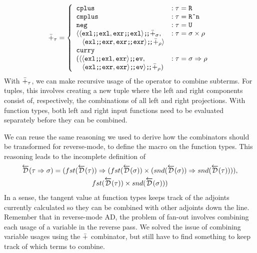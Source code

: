   \begin{align*}
    \synP_\tau =
      \left\{
        \begin{array}{ll}
          \synCplus & : \tau = \synR \\
          \synCmplus & : \tau = \synRn \\
          \synNeg & : \tau = \synUnit \\
          \langle
            \synSeq{\langle \synSeq{\synExl}{\synExl}, \synSeq{\synExr}{\synExl} \rangle}{\synP_\sigma}, & : \tau = \sigma \synStar \rho \\
            \;\;\;\synSeq{\langle \synSeq{\synExl}{\synExr}, \synSeq{\synExr}{\synExr} \rangle}{\synP_\rho} \rangle \\
          \synCurry{ \\
            (\synSeq{\langle
              \synSeq{\langle \synSeq{\synExl}{\synExl}, \synExr \rangle}{\synEv}, & : \tau = \sigma \synFunc \rho \\
              \;\;\;\synSeq{\langle \synSeq{\synExl}{\synExr}, \synExr \rangle}{\synEv} \rangle}{\synP_\rho})} \\
        \end{array}
      \right.
  \end{align*}
  With $\bar{+}_\tau$, we can make recursive usage of the operator to combine subterms.
  For tuples, this involves creating a new tuple where the left and right components consist of, respectively, the combinations of all left and right projections.
  With function types, both left and right input functions need to be evaluated separately before they can be combined.

  We can reuse the same reasoning we used to derive how the combinators should be transformed for reverse-mode, to define the macro on the function types.
  This reasoning leads to the incomplete definition of
  \begin{multline}
    \overleftarrow{\mathcal{D}}(\tau \Rightarrow \sigma) = (fst(\overleftarrow{\mathcal{D}}(\tau)) \Rightarrow (fst(\overleftarrow{\mathcal{D}}(\sigma)) \times (snd(\overleftarrow{\mathcal{D}}(\sigma)) \Rightarrow snd(\overleftarrow{\mathcal{D}}(\tau)))),
      \\ fst(\overleftarrow{\mathcal{D}}(\tau)) \times snd (\overleftarrow{\mathcal{D}}(\sigma)))
    \label{eqn:combinator_d_incorrect}
  \end{multline}
  In a sense, the tangent value at function types keeps track of the adjoints currently calculated so they can be combined with other adjoints down the line.
  Remember that in reverse-mode AD, the problem of fan-out involves combining each usage of a variable in the reverse pass.
  We solved the issue of combining variable usages using the $\bar{+}$ combinator, but still have to find something to keep track of which terms to combine.

